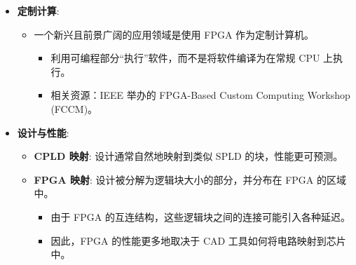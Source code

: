 \begin{frame}
\begin{itemize}
\tightlist
\item
    \textbf{定制计算}:

    \begin{itemize}
    \tightlist
    \item
    一个新兴且前景广阔的应用领域是使用 FPGA 作为定制计算机。

    \begin{itemize}
    \tightlist
    \item
        利用可编程部分``执行''软件，而不是将软件编译为在常规 CPU 上执行。
    \item
        相关资源：IEEE 举办的 FPGA-Based Custom Computing Workshop
        (FCCM)。
    \end{itemize}
    \end{itemize}
\item
    \textbf{设计与性能}:

    \begin{itemize}
    \tightlist
    \item
    \textbf{CPLD 映射}: 设计通常自然地映射到类似 SPLD
    的块，性能更可预测。
    \item
    \textbf{FPGA 映射}: 设计被分解为逻辑块大小的部分，并分布在 FPGA
    的区域中。

    \begin{itemize}
    \tightlist
    \item
        由于 FPGA 的互连结构，这些逻辑块之间的连接可能引入各种延迟。
    \item
        因此，FPGA 的性能更多地取决于 CAD 工具如何将电路映射到芯片中。
    \end{itemize}
    \end{itemize}
\end{itemize}
\end{frame}

